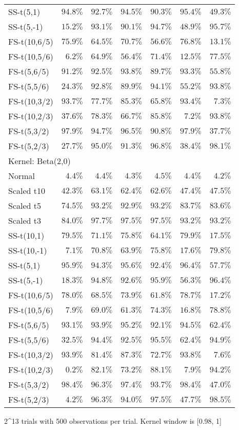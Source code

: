 \begin{longtable}{lrrrrrr}
SS-t(5,1) & $94.8\%$ & $92.7\%$ & $94.5\%$ & $90.3\%$ & $95.4\%$ & $49.3\%$ \\ 
SS-t(5,-1) & $15.2\%$ & $93.1\%$ & $90.1\%$ & $94.7\%$ & $48.9\%$ & $95.7\%$ \\ 
FS-t(10,6/5) & $75.9\%$ & $64.5\%$ & $70.7\%$ & $56.6\%$ & $76.8\%$ & $13.1\%$ \\ 
FS-t(10,5/6) & $6.2\%$ & $64.9\%$ & $56.4\%$ & $71.4\%$ & $12.5\%$ & $77.5\%$ \\ 
FS-t(5,6/5) & $91.2\%$ & $92.5\%$ & $93.8\%$ & $89.7\%$ & $93.3\%$ & $55.8\%$ \\ 
FS-t(5,5/6) & $24.3\%$ & $92.8\%$ & $89.9\%$ & $94.1\%$ & $55.2\%$ & $93.8\%$ \\ 
FS-t(10,3/2) & $93.7\%$ & $77.7\%$ & $85.3\%$ & $65.8\%$ & $93.4\%$ & $7.3\%$ \\ 
FS-t(10,2/3) & $37.6\%$ & $78.3\%$ & $66.7\%$ & $85.8\%$ & $7.2\%$ & $93.8\%$ \\ 
FS-t(5,3/2) & $97.9\%$ & $94.7\%$ & $96.5\%$ & $90.8\%$ & $97.9\%$ & $37.7\%$ \\ 
FS-t(5,2/3) & $27.7\%$ & $95.0\%$ & $91.3\%$ & $96.8\%$ & $38.4\%$ & $98.1\%$ \\ 
\midrule
\multicolumn{7}{l}{Kernel: Beta(2,0)} \\ 
\midrule
Normal & $4.4\%$ & $4.4\%$ & $4.3\%$ & $4.5\%$ & $4.4\%$ & $4.2\%$ \\ 
Scaled t10 & $42.3\%$ & $63.1\%$ & $62.4\%$ & $62.6\%$ & $47.4\%$ & $47.5\%$ \\ 
Scaled t5 & $74.5\%$ & $93.2\%$ & $92.9\%$ & $93.2\%$ & $83.7\%$ & $83.6\%$ \\ 
Scaled t3 & $84.0\%$ & $97.7\%$ & $97.5\%$ & $97.5\%$ & $93.2\%$ & $93.2\%$ \\ 
SS-t(10,1) & $79.5\%$ & $71.1\%$ & $75.8\%$ & $64.1\%$ & $79.9\%$ & $17.5\%$ \\ 
SS-t(10,-1) & $7.1\%$ & $70.8\%$ & $63.9\%$ & $75.8\%$ & $17.6\%$ & $79.8\%$ \\ 
SS-t(5,1) & $95.9\%$ & $94.3\%$ & $95.6\%$ & $92.4\%$ & $96.4\%$ & $57.7\%$ \\ 
SS-t(5,-1) & $18.3\%$ & $94.8\%$ & $92.6\%$ & $95.9\%$ & $56.3\%$ & $96.4\%$ \\ 
FS-t(10,6/5) & $78.0\%$ & $68.5\%$ & $73.9\%$ & $61.8\%$ & $78.7\%$ & $17.2\%$ \\ 
FS-t(10,5/6) & $7.9\%$ & $69.0\%$ & $61.3\%$ & $74.3\%$ & $16.8\%$ & $78.8\%$ \\ 
FS-t(5,6/5) & $93.1\%$ & $93.9\%$ & $95.2\%$ & $92.1\%$ & $94.5\%$ & $62.4\%$ \\ 
FS-t(5,5/6) & $32.5\%$ & $94.4\%$ & $92.5\%$ & $95.5\%$ & $62.4\%$ & $94.9\%$ \\ 
FS-t(10,3/2) & $93.9\%$ & $81.4\%$ & $87.3\%$ & $72.7\%$ & $93.8\%$ & $7.6\%$ \\ 
FS-t(10,2/3) & $0.2\%$ & $82.1\%$ & $73.2\%$ & $88.1\%$ & $7.9\%$ & $94.2\%$ \\ 
FS-t(5,3/2) & $98.4\%$ & $96.3\%$ & $97.4\%$ & $93.7\%$ & $98.4\%$ & $47.0\%$ \\ 
FS-t(5,2/3) & $4.2\%$ & $96.3\%$ & $94.0\%$ & $97.5\%$ & $47.7\%$ & $98.5\%$ \\ 
\bottomrule
\end{longtable}
\begin{minipage}{\linewidth}
2\textasciicircum{}13 trials with 500 observations per trial. Kernel window is [0.98, 1]\\
\end{minipage}

